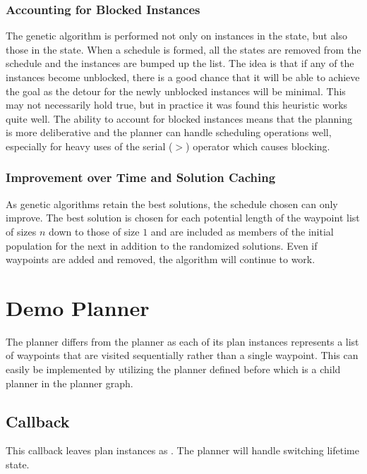 \subsubsection{Accounting for Blocked Instances}
The genetic algorithm is performed not only on instances in the  state, but also those in the  state. When a schedule is formed, all the  states are removed from the schedule and the  instances are bumped up the list. The idea is that if any of the instances become unblocked, there is a good chance that it will be able to achieve the goal as the detour for the newly unblocked instances will be minimal. This may not necessarily hold true, but in practice it was found this heuristic works quite well. The ability to account for blocked instances means that the planning is more deliberative and the planner can handle scheduling operations well, especially for heavy uses of the serial ($>$) operator which causes blocking.

\subsubsection{Improvement over Time and Solution Caching}
As genetic algorithms retain the best solutions, the schedule chosen can only improve. The best solution is chosen for each potential length of the waypoint list of sizes $n$ down to those of size $1$ and are included as members of the initial population for the next  in addition to the randomized solutions. Even if waypoints are added and removed, the algorithm will continue to work.

\section{Demo  Planner}
The  planner differs from the  planner as each of its plan instances represents a list of waypoints that are visited sequentially rather than a single waypoint. This can easily be implemented by utilizing the  planner defined before which is a child planner in the planner graph.

\subsection{Callback }
This callback leaves plan instances as . The  planner will handle switching lifetime state.

